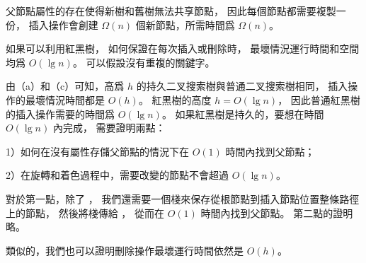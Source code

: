 \startANSWER
父節點屬性的存在使得新樹和舊樹無法共享節點，
因此每個節點都需要複製一份，
插入操作會創建 $\Omega(n)$ 個新節點，所需時間爲 $\Omega(n)$。
\stopANSWER

\startigBase[continue]\startitem%
如果可以利用紅黑樹，
如何保證在每次插入或刪除時，
最壞情況運行時間和空間均爲 $O(\lg{n})$。
可以假設沒有重複的關鍵字。
\stopitem\stopigBase

\startANSWER
由（a）和（c）可知，高爲 $h$ 的持久二叉搜索樹與普通二叉搜索樹相同，
插入操作的最壞情況時間都是 $O(h)$。
紅黑樹的高度 $h=O(\lg n)$，
因此普通紅黑樹的插入操作需要的時間爲 $O(\lg n)$。
如果紅黑樹是持久的，要想在時間 $O(\lg n)$ 內完成，
需要證明兩點：

1）如何在沒有屬性存儲父節點的情況下在 $O(1)$ 時間內找到父節點；

2）在旋轉和着色過程中，需要改變的節點不會超過 $O(\lg n)$。

對於第一點，除了 ，
我們還需要一個棧來保存從根節點到插入節點位置整條路徑上的節點，
然後將棧傳給 ，
從而在 $O(1)$ 時間內找到父節點。
第二點的證明略。

類似的，我們也可以證明刪除操作最壞運行時間依然是 $O(h)$。
\stopANSWER

\stopPROBLEM
